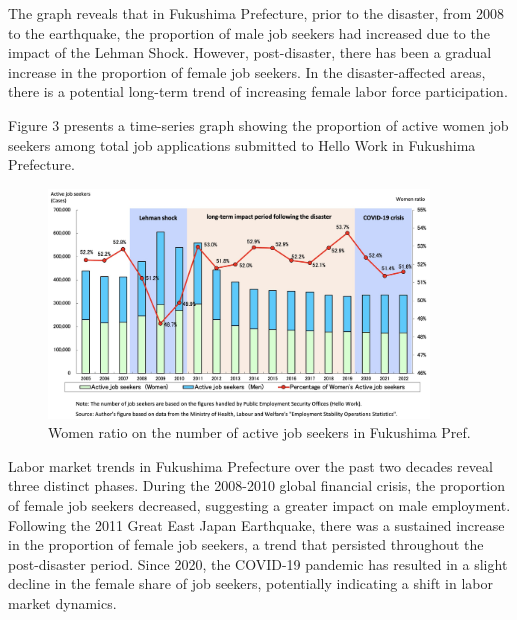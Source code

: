 \documentclass[12pt,halfline,a4paper]{ouparticle}
\begin{document}
The graph reveals that in Fukushima Prefecture, prior to the disaster, from 2008 to the earthquake, the proportion of male job seekers had increased due to the impact of the Lehman Shock. However, post-disaster, there has been a gradual increase in the proportion of female job seekers. In the disaster-affected areas, there is a potential long-term trend of increasing female labor force participation.

Figure 3 presents a time-series graph showing the proportion of active women job seekers among total job applications submitted to Hello Work in Fukushima Prefecture.

\begin{figure}[h!]
    \centering
    \includegraphics[width=0.9\textwidth]{Women ratio on the number of active job seekers2}  %
    \caption{Women ratio on the number of active job seekers in Fukushima Pref.}
    \label{fig:women_ratio_fukushima}
\end{figure}


\newpage

Labor market trends in Fukushima Prefecture over the past two decades reveal three distinct phases. During the 2008-2010 global financial crisis, the proportion of female job seekers decreased, suggesting a greater impact on male employment. Following the 2011 Great East Japan Earthquake, there was a sustained increase in the proportion of female job seekers, a trend that persisted throughout the post-disaster period. Since 2020, the COVID-19 pandemic has resulted in a slight decline in the female share of job seekers, potentially indicating a shift in labor market dynamics.

\newpage
\end{document}
